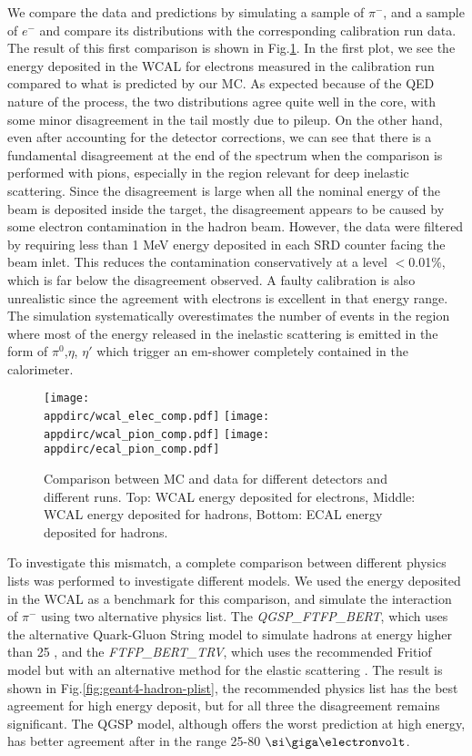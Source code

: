 We compare the data and predictions by simulating a sample of $\pi^-$, and a sample of $e^-$ and compare its distributions with the corresponding calibration run data. The result of this first comparison is shown in Fig.\ref{fig:ecal-comp}. In the first plot, we see the energy deposited in the WCAL for electrons measured in the calibration run compared to what is predicted by our MC. As expected because of the QED nature of the process, the two distributions agree quite well in the core, with some minor disagreement in the tail mostly due to pileup. On the other hand, even after accounting for the detector corrections, we can see that there is a fundamental disagreement at the end of the spectrum when the comparison is performed with pions, especially in the region relevant for deep inelastic scattering. Since the disagreement is large when all the nominal energy of the beam is deposited inside the target, the disagreement appears to be caused by some electron contamination in the hadron beam. However, the data were filtered by requiring less than 1 MeV energy deposited in each SRD counter facing the beam inlet. This reduces the contamination conservatively at a level $<$0.01\%, which is far below the disagreement observed. A faulty calibration is also unrealistic since the agreement with electrons is excellent in that energy range. The simulation systematically overestimates the number of events in the region where most of the energy released in the inelastic scattering is emitted in the form of $\pi^0$,$\eta$, $\eta'$ which trigger an em-shower completely contained in the calorimeter.

\begin{figure}[bth!]
  \centering
  \texttt{[image: \\appdirc/wcal\_elec\_comp.pdf]}
  \texttt{[image: \\appdirc/wcal\_pion\_comp.pdf]}
  \texttt{[image: \\appdirc/ecal\_pion\_comp.pdf]}
  \caption[MC/DATA Comparison of $\pi^-$ in ECAL and WCAL]{Comparison between MC and data for different detectors and different runs. Top: WCAL energy deposited for electrons, Middle: WCAL energy deposited for hadrons, Bottom: ECAL energy deposited for hadrons.}
  \label{fig:ecal-comp}
\end{figure}

To investigate this mismatch, a complete comparison between different physics lists was performed to investigate 
different models. We used the energy deposited in the WCAL as a benchmark for this comparison, and simulate the interaction of $\pi^-$ using two alternative physics list. The \textit{QGSP\_FTFP\_BERT}, which uses the alternative Quark-Gluon String model to simulate hadrons at energy higher than 25 \gev, and the \textit{FTFP\_BERT\_TRV}, which uses the recommended Fritiof model but with an alternative method for the elastic scattering \cite{AGOSTINELLI2003250}. The result is shown in Fig.\ref{fig:geant4-hadron-plist}, the recommended physics list has the best agreement for high energy deposit, but for all three the disagreement remains significant. The QGSP model, although offers the worst prediction at high energy, has better agreement after in the range 25-80 $\gev$.

